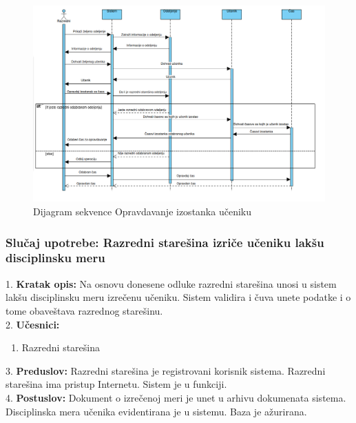 \documentclass{article}
\begin{document}
\begin{figure} [!ht]
    \begin{center}
        \includegraphics[scale=0.3]{imgs/Dijagram_sekvence_razredni_pravda_cas.png}
    \end{center}
\caption{Dijagram sekvence Opravdavanje izostanka učeniku}
\end{figure}


\newpage
\subsubsection{Slučaj upotrebe: Razredni starešina izriče učeniku lakšu disciplinsku meru}
1. \textbf{Kratak opis:} Na osnovu donesene odluke razredni starešina unosi u sistem lakšu disciplinsku meru izrečenu učeniku. Sistem validira i čuva unete podatke i o tome obaveštava razrednog starešinu. \\

2. \textbf{Učesnici:}
\begin{enumerate} [label=(\alph*)]
\item Razredni starešina
\end{enumerate} 

3. \textbf{Preduslov:} Razredni starešina je registrovani korisnik sistema. Razredni starešina ima pristup Internetu. Sistem je u funkciji. \\

4. \textbf{Postuslov:} Dokument o izrečenoj meri je unet u arhivu dokumenata sistema. Disciplinska mera učenika evidentirana je u sistemu. Baza je ažurirana. \\
\end{document}
